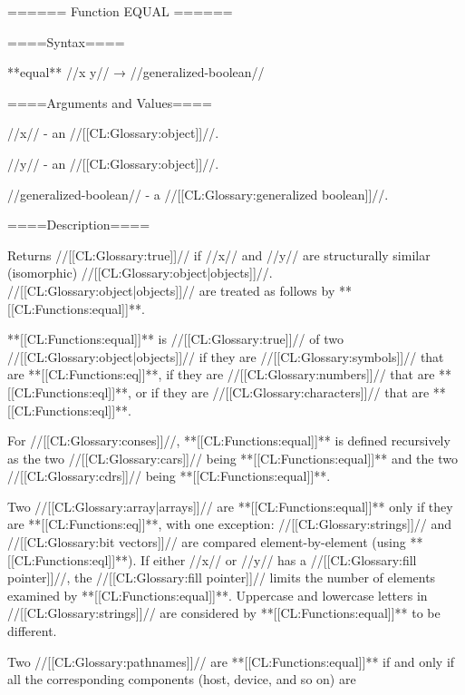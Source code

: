 ====== Function EQUAL ======

====Syntax====

**equal** //x y// → //generalized-boolean//

====Arguments and Values====

//x// - an //[[CL:Glossary:object]]//.

//y// - an //[[CL:Glossary:object]]//.

//generalized-boolean// - a //[[CL:Glossary:generalized boolean]]//.

====Description====

Returns //[[CL:Glossary:true]]// if //x// and //y// are structurally similar (isomorphic) //[[CL:Glossary:object|objects]]//. //[[CL:Glossary:object|objects]]// are treated as follows by **[[CL:Functions:equal]]**.

\beginlist {}

**[[CL:Functions:equal]]** is //[[CL:Glossary:true]]// of two //[[CL:Glossary:object|objects]]// if they are //[[CL:Glossary:symbols]]// that are **[[CL:Functions:eq]]**, if they are //[[CL:Glossary:numbers]]// that are **[[CL:Functions:eql]]**, or if they are //[[CL:Glossary:characters]]// that are **[[CL:Functions:eql]]**.


For //[[CL:Glossary:conses]]//, **[[CL:Functions:equal]]** is defined recursively as the two //[[CL:Glossary:cars]]// being **[[CL:Functions:equal]]** and the two //[[CL:Glossary:cdrs]]// being **[[CL:Functions:equal]]**.


Two //[[CL:Glossary:array|arrays]]// are **[[CL:Functions:equal]]** only if they are **[[CL:Functions:eq]]**, with one exception: //[[CL:Glossary:strings]]// and //[[CL:Glossary:bit vectors]]// are compared element-by-element (using **[[CL:Functions:eql]]**). If either //x// or //y// has a //[[CL:Glossary:fill pointer]]//, the //[[CL:Glossary:fill pointer]]// limits the number of elements examined by **[[CL:Functions:equal]]**. Uppercase and lowercase letters in //[[CL:Glossary:strings]]// are considered by **[[CL:Functions:equal]]** to be different.


Two //[[CL:Glossary:pathnames]]// are **[[CL:Functions:equal]]** if and only if all the corresponding components (host, device, and so on) are

